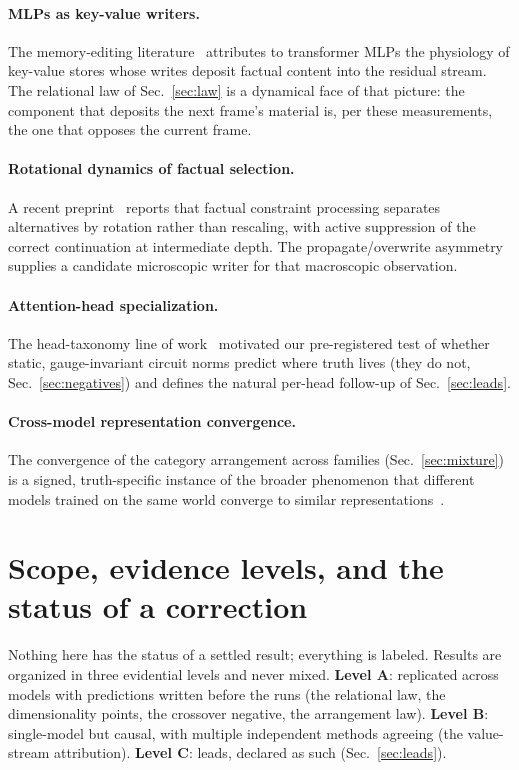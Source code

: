 \documentclass[11pt]{article}
\begin{document}
\paragraph{MLPs as key-value writers.} The memory-editing
literature~\cite{meng2022} attributes to transformer MLPs the physiology of
key-value stores whose writes deposit factual content into the residual
stream. The relational law of Sec.~\ref{sec:law} is a dynamical face of that
picture: the component that deposits the next frame's material is, per these
measurements, the one that opposes the current frame.

\paragraph{Rotational dynamics of factual selection.} A recent
preprint~\cite{rotational2026} reports that factual constraint processing
separates alternatives by rotation rather than rescaling, with active
suppression of the correct continuation at intermediate depth. The
propagate/overwrite asymmetry supplies a candidate microscopic writer for
that macroscopic observation.

\paragraph{Attention-head specialization.} The head-taxonomy line of
work~\cite{headgenome} motivated our pre-registered test of whether static,
gauge-invariant circuit norms predict where truth lives (they do not,
Sec.~\ref{sec:negatives}) and defines the natural per-head follow-up of
Sec.~\ref{sec:leads}.

\paragraph{Cross-model representation convergence.} The convergence of the
category arrangement across families (Sec.~\ref{sec:mixture}) is a signed,
truth-specific instance of the broader phenomenon that different models
trained on the same world converge to similar
representations~\cite{platonic2024}.

\section{Scope, evidence levels, and the status of a correction}
\label{sec:scope}

Nothing here has the status of a settled result; everything is labeled.
Results are organized in three evidential levels and never mixed.
\textbf{Level A}: replicated across models with predictions written before
the runs (the relational law, the dimensionality points, the crossover
negative, the arrangement law). \textbf{Level B}: single-model but causal,
with multiple independent methods agreeing (the value-stream attribution).
\textbf{Level C}: leads, declared as such (Sec.~\ref{sec:leads}).
\end{document}
